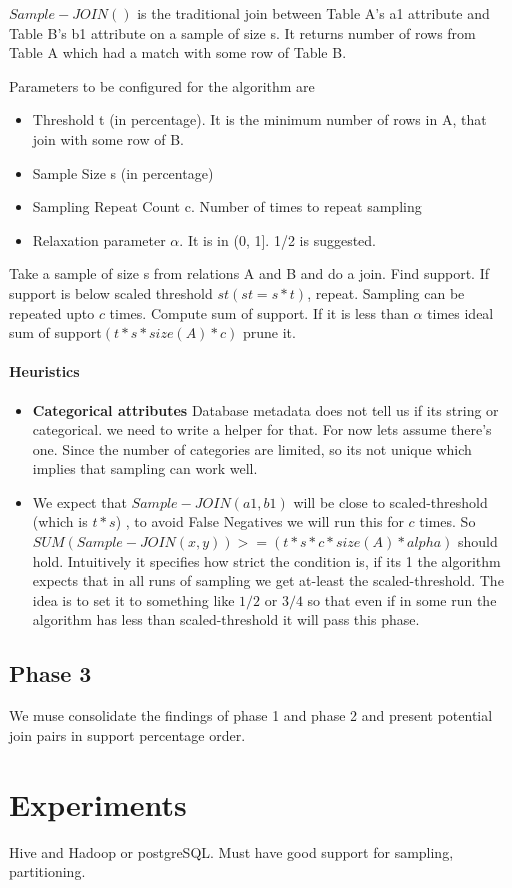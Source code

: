 \documentclass{article}
\begin{document}
$Sample-JOIN()$ is the traditional join between Table A's a1 attribute and Table B's b1 attribute on a sample of size s.  It returns number of rows from Table A which had a match with some row of Table B.

Parameters to be configured for the algorithm are
\begin{itemize}
\item Threshold t (in percentage). It is the minimum number of rows in A, that join with some row of B.
\item Sample Size s (in percentage)
\item Sampling Repeat Count c. Number of times to repeat sampling
\item Relaxation parameter $\alpha$. It is in (0, 1]. 1/2 is suggested.
\end{itemize}

Take a sample of size s from relations A and B and do a join. Find support. If support is below scaled threshold $st( st = s * t)$, repeat. Sampling can be repeated upto $c$ times.
Compute sum of support. If it is less than $\alpha$ times ideal sum of support$(t * s * size(A) * c)$ prune it.

\paragraph{Heuristics}
\begin{itemize}


\item \textbf{Categorical attributes} Database metadata does not tell us if its string or categorical. we need to write a helper for that. For now lets assume there's one. 	         Since the number of categories are limited, so its not unique which implies that sampling can work well.

\item We expect that $Sample-JOIN(a1,b1)$ will be close to scaled-threshold (which is $t * s$) , to avoid False Negatives we will run this for $c$ times. So $SUM(Sample-JOIN(x,y)) >= (t * s * c * size(A) * alpha)$ should hold. Intuitively it specifies how strict the condition is, if its 1 the algorithm expects that in all runs of sampling we get at-least the scaled-threshold.  The idea is to set it to something like $1/2$ or $3/4$ so that even if in some run the algorithm has less than scaled-threshold it will pass this phase.
\end{itemize}

\subsection{Phase 3}
We muse consolidate the findings of phase 1 and phase 2 and present potential join pairs in support percentage order.
\section{Experiments}

Hive and Hadoop or postgreSQL. Must have good support for sampling, partitioning. 
\end{document}

